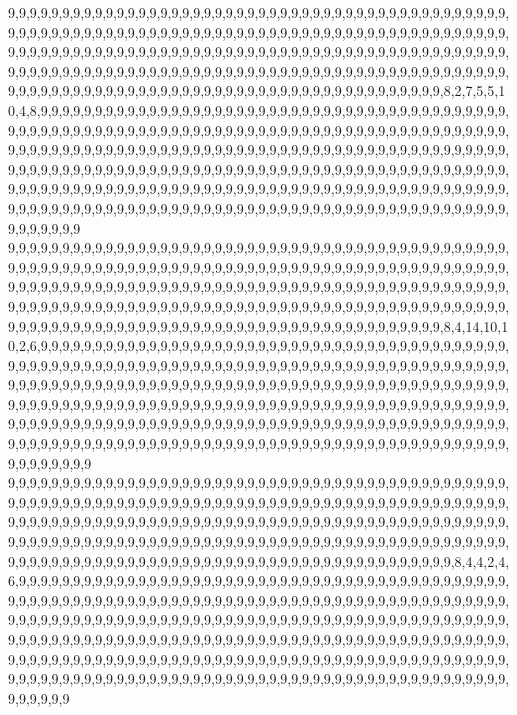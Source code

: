 9,9,9,9,9,9,9,9,9,9,9,9,9,9,9,9,9,9,9,9,9,9,9,9,9,9,9,9,9,9,9,9,9,9,9,9,9,9,9,9,9,9,9,9,9,9,9,9,9,9,9,9,9,9,9,9,9,9,9,9,9,9,9,9,9,9,9,9,9,9,9,9,9,9,9,9,9,9,9,9,9,9,9,9,9,9,9,9,9,9,9,9,9,9,9,9,9,9,9,9,9,9,9,9,9,9,9,9,9,9,9,9,9,9,9,9,9,9,9,9,9,9,9,9,9,9,9,9,9,9,9,9,9,9,9,9,9,9,9,9,9,9,9,9,9,9,9,9,9,9,9,9,9,9,9,9,9,9,9,9,9,9,9,9,9,9,9,9,9,9,9,9,9,9,9,9,9,9,9,9,9,9,9,9,9,9,9,9,9,9,9,9,9,9,9,9,9,9,9,9,9,9,9,9,9,9,9,9,9,9,9,9,9,9,9,9,9,9,9,9,9,9,9,9,8,2,7,5,5,10,4,8,9,9,9,9,9,9,9,9,9,9,9,9,9,9,9,9,9,9,9,9,9,9,9,9,9,9,9,9,9,9,9,9,9,9,9,9,9,9,9,9,9,9,9,9,9,9,9,9,9,9,9,9,9,9,9,9,9,9,9,9,9,9,9,9,9,9,9,9,9,9,9,9,9,9,9,9,9,9,9,9,9,9,9,9,9,9,9,9,9,9,9,9,9,9,9,9,9,9,9,9,9,9,9,9,9,9,9,9,9,9,9,9,9,9,9,9,9,9,9,9,9,9,9,9,9,9,9,9,9,9,9,9,9,9,9,9,9,9,9,9,9,9,9,9,9,9,9,9,9,9,9,9,9,9,9,9,9,9,9,9,9,9,9,9,9,9,9,9,9,9,9,9,9,9,9,9,9,9,9,9,9,9,9,9,9,9,9,9,9,9,9,9,9,9,9,9,9,9,9,9,9,9,9,9,9,9,9,9,9,9,9,9,9,9,9,9,9,9,9,9,9,9,9,9,9,9,9,9,9,9,9,9,9,9,9,9,9,9,9,9,9,9,9,9,9,9,9,9,9,9,9,9,9,9,9,9,9,9,9,9,9,9,9,9,9,9,9,9,9,9,9,9,9,9,9,9,9,9,9,9
9,9,9,9,9,9,9,9,9,9,9,9,9,9,9,9,9,9,9,9,9,9,9,9,9,9,9,9,9,9,9,9,9,9,9,9,9,9,9,9,9,9,9,9,9,9,9,9,9,9,9,9,9,9,9,9,9,9,9,9,9,9,9,9,9,9,9,9,9,9,9,9,9,9,9,9,9,9,9,9,9,9,9,9,9,9,9,9,9,9,9,9,9,9,9,9,9,9,9,9,9,9,9,9,9,9,9,9,9,9,9,9,9,9,9,9,9,9,9,9,9,9,9,9,9,9,9,9,9,9,9,9,9,9,9,9,9,9,9,9,9,9,9,9,9,9,9,9,9,9,9,9,9,9,9,9,9,9,9,9,9,9,9,9,9,9,9,9,9,9,9,9,9,9,9,9,9,9,9,9,9,9,9,9,9,9,9,9,9,9,9,9,9,9,9,9,9,9,9,9,9,9,9,9,9,9,9,9,9,9,9,9,9,9,9,9,9,9,9,9,9,9,9,9,8,4,14,10,10,2,6,9,9,9,9,9,9,9,9,9,9,9,9,9,9,9,9,9,9,9,9,9,9,9,9,9,9,9,9,9,9,9,9,9,9,9,9,9,9,9,9,9,9,9,9,9,9,9,9,9,9,9,9,9,9,9,9,9,9,9,9,9,9,9,9,9,9,9,9,9,9,9,9,9,9,9,9,9,9,9,9,9,9,9,9,9,9,9,9,9,9,9,9,9,9,9,9,9,9,9,9,9,9,9,9,9,9,9,9,9,9,9,9,9,9,9,9,9,9,9,9,9,9,9,9,9,9,9,9,9,9,9,9,9,9,9,9,9,9,9,9,9,9,9,9,9,9,9,9,9,9,9,9,9,9,9,9,9,9,9,9,9,9,9,9,9,9,9,9,9,9,9,9,9,9,9,9,9,9,9,9,9,9,9,9,9,9,9,9,9,9,9,9,9,9,9,9,9,9,9,9,9,9,9,9,9,9,9,9,9,9,9,9,9,9,9,9,9,9,9,9,9,9,9,9,9,9,9,9,9,9,9,9,9,9,9,9,9,9,9,9,9,9,9,9,9,9,9,9,9,9,9,9,9,9,9,9,9,9,9,9,9,9,9,9,9,9,9,9,9,9,9,9,9,9,9,9,9,9,9,9,9
9,9,9,9,9,9,9,9,9,9,9,9,9,9,9,9,9,9,9,9,9,9,9,9,9,9,9,9,9,9,9,9,9,9,9,9,9,9,9,9,9,9,9,9,9,9,9,9,9,9,9,9,9,9,9,9,9,9,9,9,9,9,9,9,9,9,9,9,9,9,9,9,9,9,9,9,9,9,9,9,9,9,9,9,9,9,9,9,9,9,9,9,9,9,9,9,9,9,9,9,9,9,9,9,9,9,9,9,9,9,9,9,9,9,9,9,9,9,9,9,9,9,9,9,9,9,9,9,9,9,9,9,9,9,9,9,9,9,9,9,9,9,9,9,9,9,9,9,9,9,9,9,9,9,9,9,9,9,9,9,9,9,9,9,9,9,9,9,9,9,9,9,9,9,9,9,9,9,9,9,9,9,9,9,9,9,9,9,9,9,9,9,9,9,9,9,9,9,9,9,9,9,9,9,9,9,9,9,9,9,9,9,9,9,9,9,9,9,9,9,9,9,9,9,9,8,4,4,2,4,6,9,9,9,9,9,9,9,9,9,9,9,9,9,9,9,9,9,9,9,9,9,9,9,9,9,9,9,9,9,9,9,9,9,9,9,9,9,9,9,9,9,9,9,9,9,9,9,9,9,9,9,9,9,9,9,9,9,9,9,9,9,9,9,9,9,9,9,9,9,9,9,9,9,9,9,9,9,9,9,9,9,9,9,9,9,9,9,9,9,9,9,9,9,9,9,9,9,9,9,9,9,9,9,9,9,9,9,9,9,9,9,9,9,9,9,9,9,9,9,9,9,9,9,9,9,9,9,9,9,9,9,9,9,9,9,9,9,9,9,9,9,9,9,9,9,9,9,9,9,9,9,9,9,9,9,9,9,9,9,9,9,9,9,9,9,9,9,9,9,9,9,9,9,9,9,9,9,9,9,9,9,9,9,9,9,9,9,9,9,9,9,9,9,9,9,9,9,9,9,9,9,9,9,9,9,9,9,9,9,9,9,9,9,9,9,9,9,9,9,9,9,9,9,9,9,9,9,9,9,9,9,9,9,9,9,9,9,9,9,9,9,9,9,9,9,9,9,9,9,9,9,9,9,9,9,9,9,9,9,9,9,9,9,9,9,9,9,9,9,9,9,9,9,9,9,9,9,9,9,9,9
